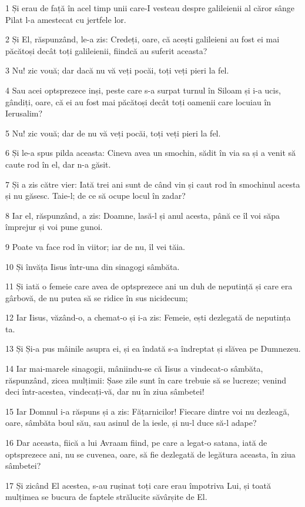 \par 1 Și erau de față în acel timp unii care-I vesteau despre galileienii al căror sânge Pilat l-a amestecat cu jertfele lor.
\par 2 Și El, răspunzând, le-a zis: Credeți, oare, că acești galileieni au fost ei mai  păcătoși decât toți galileienii, fiindcă au suferit aceasta?
\par 3 Nu! zic vouă; dar dacă nu vă veți pocăi, toți veți pieri la fel.
\par 4 Sau acei optsprezece inși, peste care s-a surpat turnul în Siloam și i-a ucis, gândiți, oare, că ei au fost mai păcătoși decât toți oamenii care locuiau în Ierusalim?
\par 5 Nu! zic vouă; dar de nu vă veți pocăi, toți veți pieri la fel.
\par 6 Și le-a spus pilda aceasta: Cineva avea un smochin, sădit în via sa și a venit să caute rod în el, dar n-a găsit.
\par 7 Și a zis către vier: Iată trei ani sunt de când vin și caut rod în smochinul acesta și nu găsesc. Taie-l; de ce să ocupe locul în zadar?
\par 8 Iar el, răspunzând, a zis: Doamne, lasă-l și anul acesta, până ce îl voi săpa împrejur și voi pune gunoi.
\par 9 Poate va face rod în viitor; iar de nu, îl vei tăia.
\par 10 Și învăța Iisus într-una din sinagogi sâmbăta.
\par 11 Și iată o femeie care avea de optsprezece ani un duh de neputință și care era gârbovă, de nu putea să se ridice în sus nicidecum;
\par 12 Iar Iisus, văzând-o, a chemat-o și i-a zis: Femeie, ești dezlegată de neputința ta.
\par 13 Și Și-a pus mâinile asupra ei, și ea îndată s-a îndreptat și slăvea pe Dumnezeu.
\par 14 Iar mai-marele sinagogii, mâniindu-se că Iisus a vindecat-o sâmbăta, răspunzând, zicea mulțimii: Șase zile sunt în care trebuie să se lucreze; venind deci într-acestea, vindecați-vă, dar nu în ziua sâmbetei!
\par 15 Iar Domnul i-a răspuns și a zis: Fățarnicilor! Fiecare dintre voi nu dezleagă, oare, sâmbăta boul său, sau asinul de la iesle, și nu-l duce să-l adape?
\par 16 Dar aceasta, fiică a lui Avraam fiind, pe care a legat-o satana, iată de optsprezece ani, nu se cuvenea, oare, să fie dezlegată de legătura aceasta, în ziua sâmbetei?
\par 17 Și zicând El acestea, s-au rușinat toți care erau împotriva Lui, și toată mulțimea se bucura de faptele strălucite săvârșite de El.
